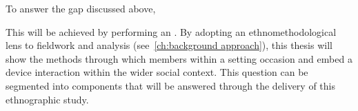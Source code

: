 To answer the gap discussed above, 

\begin{revisedsubmission}
\noindent{}This will be achieved by performing an .
By adopting an ethnomethodological lens to fieldwork and analysis (see~\autoref{ch:background approach}), this thesis will show the methods through which members within a setting occasion and embed a device interaction within the wider social context.
This question can be segmented into components that will be answered through the delivery of this ethnographic study.

\end{revisedsubmission}






